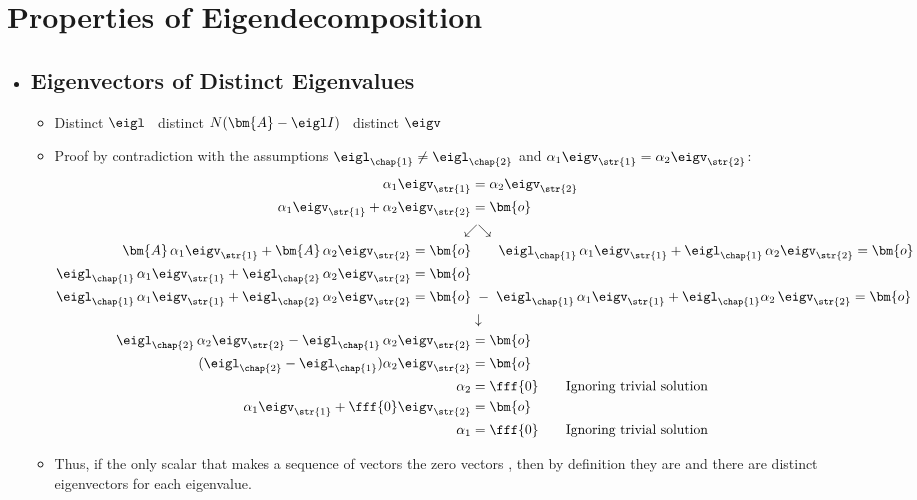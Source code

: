 \section{Properties of Eigendecomposition}\label{Properties of Eigendecomposition}
\begin{itemize}
  \item []
  
  \subsection{Eigenvectors of Distinct Eigenvalues}\label{Eigenvectors of Distinct Eigenvalues}
  \begin{itemize}
    \item Distinct \(\eigl\) \to~distinct \(N(\bm{A}-\eigl I)\) \to~distinct \(\eigv\)
    \item Proof by contradiction with the assumptions \(\eigl_\chap{1} \neq \eigl_\chap{2}\) and \(\alpha_1 \eigv_\str{1} = \alpha_2\eigv_\str{2} \):
    \begin{align*}
      \alpha_1 \eigv_\str{1} &= \alpha_2\eigv_\str{2} \\
      \alpha_1 \eigv_\str{1} + \alpha_2\eigv_\str{2} &= \bm{o} \\
      &\hspace{-8pt}\swarrow\searrow \\
      \bm{A}\,\alpha_1 \eigv_\str{1} + \bm{A}\,\alpha_2\eigv_\str{2} = \bm{o} &\qquad 
      \eigl_\chap{1}\,\alpha_1 \eigv_\str{1} + \eigl_\chap{1}\,\alpha_2\eigv_\str{2} = \bm{o}  \\
      \eigl_\chap{1}\,\alpha_1 \eigv_\str{1} + \eigl_\chap{2}\,\alpha_2\eigv_\str{2} = \bm{o} &\qquad  \\
      \eigl_\chap{1}\,\alpha_1 \eigv_\str{1} + \eigl_\chap{2}\,\alpha_2\eigv_\str{2} = \bm{o} &\hspace{3pt}-
      \hspace{3pt}\eigl_\chap{1}\,\alpha_1 \eigv_\str{1} + \eigl_\chap{1}\alpha_2\,\eigv_\str{2} = \bm{o} \\
      &\downarrow \\
      \eigl_\chap{2}\,\alpha_2 \eigv_\str{2} - \eigl_\chap{1}\,\alpha_2\eigv_\str{2} &= \bm{o} \\
      (\eigl_\chap{2} - \eigl_\chap{1})\alpha_2 \eigv_\str{2}&=\bm{o} \\
      \alpha_2 &= \fff{0} \qquad \text{Ignoring trivial solution} \\
      \alpha_1 \eigv_\str{1} + \fff{0}\eigv_\str{2} &= \bm{o} \\
      \alpha_1 &= \fff{0} \qquad \text{Ignoring trivial solution}
    \end{align*}
    \item Thus, if the only scalar that makes a sequence of vectors the zero vectors , then by definition they are \hyperref[Linear Independence]{} and there are distinct eigenvectors for each eigenvalue.
  \end{itemize}
  

\end{itemize}

